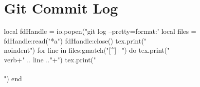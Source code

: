 \section{Git Commit Log}\label{sec:Git Commit Log} %

\footnotesize
\begin{luacode*}
    local fdHandle = io.popen("git log --pretty=format:'%
    local files = fdHandle:read("*a")
    fdHandle:close()
    tex.print("\\noindent")
    for line in files:gmatch("[^\r\n]+") do
        tex.print("\\verb+" .. line .."+")
        tex.print("\\\\")
    end
\end{luacode*}

